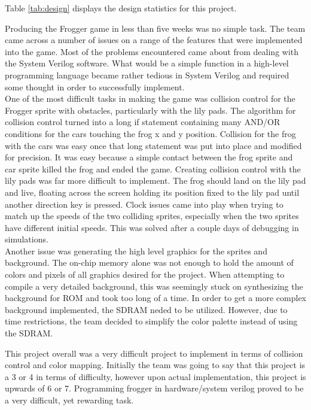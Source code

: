 \documentclass[journal, twocolumn, final,11pt,letterpaper]{IEEEtran}
\begin{document}
Table \ref{tab:design} displays the design statistics for this project. 

Producing the Frogger game in less than five weeks was no simple task.  The team came across a number of issues on a range of the features that were implemented into the game.  Most of the problems encountered came about from dealing with the System Verilog software.  What would be a simple function in a high-level programming language became rather tedious in System Verilog and required some thought in order to successfully implement.  \\

One of the most difficult tasks in making the game was collision control for the Frogger sprite with obstacles, particularly with the lily pads.  The algorithm for collision control turned into a long if statement containing many AND/OR conditions for the cars touching the frog x and y position.  Collision for the frog with the cars was easy once that long statement was put into place and modified for precision.  It was easy because a simple contact between the frog sprite and car sprite killed the frog and ended the game.  Creating collision control with the lily pads was far more difficult to implement.  The frog should land on the lily pad and live, floating across the screen holding its position fixed to the lily pad until another direction key is pressed.  Clock issues came into play when trying to match up the speeds of the two colliding sprites, especially when the two sprites have different initial speeds. This was solved after a couple days of debugging in simulations.  \\

Another issue was generating the high level graphics for the sprites and background.  The on-chip memory alone was not enough to hold the amount of colors and pixels of all graphics desired for the project. When attempting to compile a very detailed background, this was seemingly stuck on synthesizing the background for ROM and took too long of a time. In order to get a more complex background implemented, the SDRAM neded to be utilized. However, due to time restrictions, the team decided to simplify the color palette instead of using the SDRAM.

This project overall was a very difficult project to implement in terms of collision control and color mapping. Initially the team was going to say that this project is a 3 or 4 in terms of difficulty, however upon actual implementation, this project is upwards of 6 or 7. Programming frogger in hardware/system verilog proved to be a very difficult, yet rewarding task. 
\end{document}
